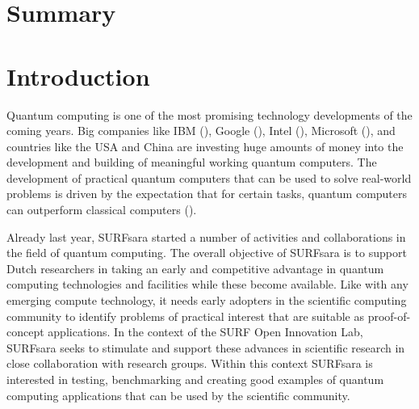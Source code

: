\documentclass[a4paper]{article}
\begin{document}
\vspace{4cm}
\newpage

\tableofcontents

\newpage

\section{Summary}

\newpage

\section{Introduction}
Quantum computing is one of the most promising technology developments of the coming years.
Big companies like IBM (\cite{ibm-quantum}), Google (\cite{google-quantum}), Intel (\cite{intel-quantum}), Microsoft (\cite{microsoft-quantum}), and countries like the USA and China are investing huge amounts of money into the development and building of meaningful working quantum computers.
The development of practical quantum computers that can be used to solve real-world problems is driven by the expectation that for certain tasks, quantum computers can outperform classical computers (\cite{preskill-qc}).

Already last year, SURFsara started a number of activities and collaborations in the field of quantum computing.
The overall objective of SURFsara is to support Dutch researchers in taking an early and competitive advantage in quantum computing technologies and facilities while these become available.
Like with any  emerging compute technology, it needs early adopters in the scientific computing community to identify problems of practical interest that are suitable as proof-of-concept applications.
In the context of the SURF Open Innovation Lab, SURFsara seeks to stimulate and support these advances in scientific research in close collaboration with research groups.
Within this context SURFsara is interested in testing, benchmarking and creating good examples of quantum computing applications that can be used by the scientific community.
\end{document}
